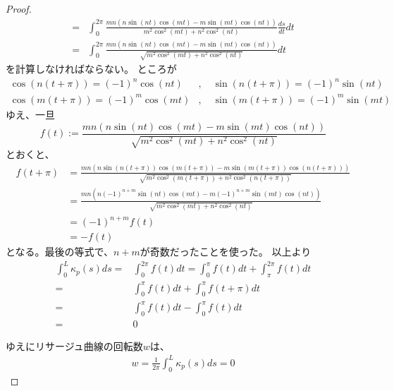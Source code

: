 \begin{proof}
\begin{align*}
    =&\int_0^{2\pi}\frac{mn(n\sin(nt)\cos(mt)-m\sin(mt)\cos(nt))}{m^2\cos^2(mt)+n^2\cos^2(nt)}\frac{ds}{dt}dt\\
    =&\int_0^{2\pi}\frac{mn(n\sin(nt)\cos(mt)-m\sin(mt)\cos(nt))}{\sqrt{m^2\cos^2(mt)+n^2\cos^2(nt)}}dt
  \end{align*}
  を計算しなければならない。
  ところが
  \begin{align*}
    \cos(n(t+\pi))=(-1)^n\cos(nt)&,\quad \sin(n(t+\pi))=(-1)^n\sin(nt)\\
    \cos(m(t+\pi))=(-1)^m\cos(mt)&,\quad \sin(m(t+\pi))=(-1)^m\sin(mt)
  \end{align*}
  ゆえ、一旦
  \[
    f(t):=\frac{mn(n\sin(nt)\cos(mt)-m\sin(mt)\cos(nt))}{\sqrt{m^2\cos^2(mt)+n^2\cos^2(nt)}}
  \]
  とおくと、
  \begin{align*}
    f(t+\pi)&=\frac{mn(n\sin(n(t+\pi))\cos(m(t+\pi))-m\sin(m(t+\pi))\cos(n(t+\pi)))}{\sqrt{m^2\cos^2(m(t+\pi))+n^2\cos^2(n(t+\pi))}}\\
    &=\frac{mn(n(-1)^{n+m}\sin(nt)\cos(mt)-m(-1)^{n+m}\sin(mt)\cos(nt))}{\sqrt{m^2\cos^2(mt)+n^2\cos^2(nt)}}\\
    &=(-1)^{n+m}f(t)\\
    &=-f(t)
  \end{align*}
  となる。最後の等式で、$n+m$が奇数だったことを使った。
  以上より
  \begin{align*}
    \int_0^L\kappa_p(s)ds=&\int_0^{2\pi}f(t)dt=\int_0^\pi f(t)dt+\int_\pi^{2\pi}f(t)dt\\
    =&\int_0^\pi f(t)dt+\int_0^\pi f(t+\pi)dt\\
    =&\int_0^\pi f(t)dt-\int_0^\pi f(t)dt\\
    =&0
  \end{align*}

  ゆえにリサージュ曲線の回転数$w$は、
  \begin{align*}
    w=\frac1{2\pi}\int_0^L\kappa_p(s)ds=0
  \end{align*}
\end{proof}

\vspace{1em}


